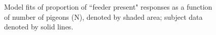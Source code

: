 \documentclass{article}
\begin{document}
\begin{figure}[ht]
\begin{center}
   \caption[``Feeder present'' responses and model fits]{Model fits of proportion of ``feeder present" responses as a function of number of pigeons (N), denoted by shaded area; subject data denoted by solid lines.} 
   \label{fig:paff_fig_NC1C0}
\end{center}
\end{figure}
\end{document}
